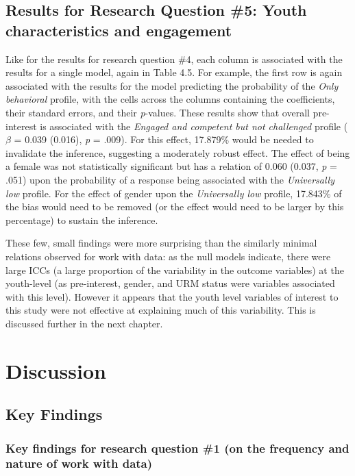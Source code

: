 \documentclass[]{book}
\theoremstyle{definition}
\theoremstyle{definition}
\theoremstyle{definition}
\theoremstyle{remark}
\begin{document}
\section{Results for Research Question \#5: Youth characteristics and
engagement}\label{results-for-research-question-5-youth-characteristics-and-engagement}

Like for the results for research question \#4, each column is
associated with the results for a single model, again in Table 4.5. For
example, the first row is again associated with the results for the
model predicting the probability of the \emph{Only behavioral} profile,
with the cells across the columns containing the coefficients, their
standard errors, and their \emph{p}-values. These results show that
overall pre-interest is associated with the \emph{Engaged and competent
but not challenged} profile (\(\beta\) = 0.039 (0.016), \emph{p} =
.009). For this effect, 17.879\% would be needed to invalidate the
inference, suggesting a moderately robust effect. The effect of being a
female was not statistically significant but has a relation of 0.060
(0.037, \emph{p} = .051) upon the probability of a response being
associated with the \emph{Universally low} profile. For the effect of
gender upon the \emph{Universally low} profile, 17.843\% of the bias
would need to be removed (or the effect would need to be larger by this
percentage) to sustain the inference.

These few, small findings were more surprising than the similarly
minimal relations observed for work with data: as the null models
indicate, there were large ICCs (a large proportion of the variability
in the outcome variables) at the youth-level (as pre-interest, gender,
and URM status were variables associated with this level). However it
appears that the youth level variables of interest to this study were
not effective at explaining much of this variability. This is discussed
further in the next chapter.

\chapter{Discussion}\label{discussion}

\section{Key Findings}\label{key-findings}

\subsection{Key findings for research question \#1 (on the frequency and
nature of work with
data)}\label{key-findings-for-research-question-1-on-the-frequency-and-nature-of-work-with-data}
\end{document}
